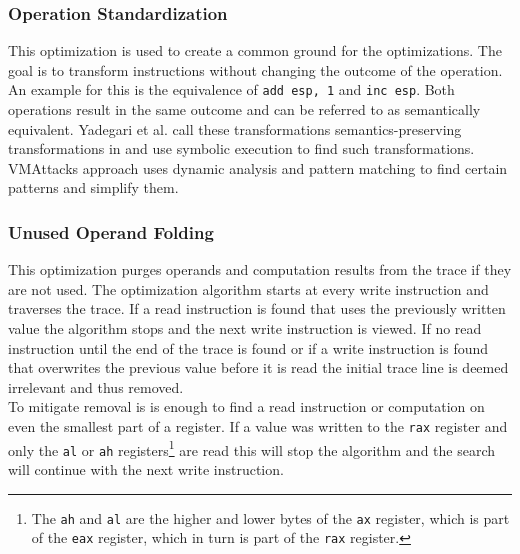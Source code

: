 \documentclass[10pt,twoside,a4paper,bibliography=totoc]{scrbook}
\newcommand{\code}[1]{\texttt{#1}}
\begin{document}
\subsubsection{Operation Standardization}
This optimization is used to create a common ground for the optimizations. The goal is to transform instructions without changing the outcome of the operation. 
An example for this is the equivalence of \code{add esp, 1} and \code{inc esp}. Both operations result in the same outcome and can be referred to as semantically equivalent. 
Yadegari et al. call these transformations semantics-preserving transformations in \cite{DBLP:conf/sp/YadegariJWD15} and use symbolic execution to find such transformations. 
VMAttacks approach uses dynamic analysis and pattern matching to find certain patterns and simplify them.

\subsubsection{Unused Operand Folding}
This optimization purges operands and computation results from the trace if they are not used. 
The optimization algorithm starts at every write instruction and traverses the trace. 
If a read instruction is found that uses the previously written value the algorithm stops and the next write instruction is viewed. 
If no read instruction until the end of the trace is found or if a write instruction is found that overwrites the previous value before it is read the initial trace line is deemed irrelevant and thus removed. \\
To mitigate removal is is enough to find a read instruction or computation on even the smallest part of a register. If a value was written to the \code{rax} register and only the \code{al} or \code{ah} registers\footnote{The \code{ah} and \code{al} are the higher and lower bytes of the \code{ax} register, which is part of the \code{eax} register, which in turn is part of the \code{rax} register.} are read this will stop the algorithm and the search will continue with the next write instruction.
\end{document}
